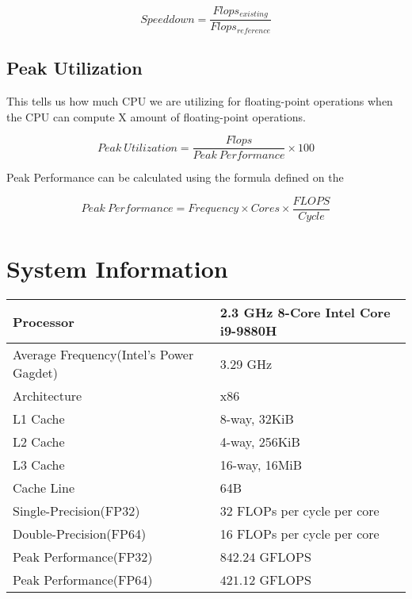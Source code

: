 \begin{equation}
    Speeddown = \frac{Flops_{existing}}{Flops_{reference}}
    \label{eq:speeddown}
\end{equation}

\subsection{Peak Utilization}

This tells us how much CPU we are utilizing for floating-point operations when 
the CPU can compute X amount of floating-point operations.

\begin{equation}
    Peak\ Utilization = \frac{Flops}{Peak\ Performance} \times 100
    \label{eq:peak_util}
\end{equation}

Peak Performance can be calculated using the formula defined on the \citep{wiki:FLOPS}

\begin{equation}
    Peak\ Performance = Frequency \times Cores \times \frac{FLOPS}{Cycle}
\end{equation}

\clearpage
\section{System Information}
\begin{table}[htb]
    \centering
    \begin{tabular}{|l | l|}
        \hline
        Processor & 2.3 GHz 8-Core Intel Core i9-9880H \\
        \hline
        Average Frequency(Intel's Power Gagdet) & 3.29 GHz \\
        \hline
        Architecture & x86 \\
        \hline
        L1 Cache & 8-way, 32KiB \\
        \hline
        L2 Cache & 4-way, 256KiB \\
        \hline
        L3 Cache & 16-way, 16MiB \\
        \hline
        Cache Line & 64B \\
        \hline
        Single-Precision(FP32) & 32 FLOPs per cycle per core \\
        \hline
        Double-Precision(FP64) & 16 FLOPs per cycle per core\\
        \hline
        Peak Performance(FP32) & $842.24$ GFLOPS\\
        \hline
        Peak Performance(FP64) & $421.12$ GFLOPS\\
        \hline
    \end{tabular}
\end{table}

